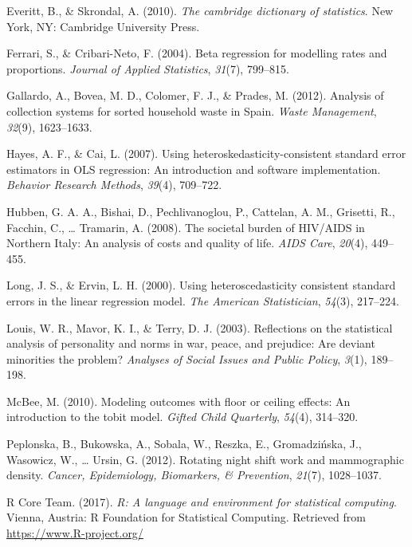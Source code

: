 \documentclass[english,man]{apa6}
\theoremstyle{definition}
\theoremstyle{definition}
\theoremstyle{remark}
\begin{document}
\hypertarget{ref-everitt2002cambridge}{}
Everitt, B., \& Skrondal, A. (2010). \emph{The cambridge dictionary of
statistics}. New York, NY: Cambridge University Press.

\hypertarget{ref-ferrari2004beta}{}
Ferrari, S., \& Cribari-Neto, F. (2004). Beta regression for modelling
rates and proportions. \emph{Journal of Applied Statistics},
\emph{31}(7), 799--815.

\hypertarget{ref-gallardo2012analysis}{}
Gallardo, A., Bovea, M. D., Colomer, F. J., \& Prades, M. (2012).
Analysis of collection systems for sorted household waste in Spain.
\emph{Waste Management}, \emph{32}(9), 1623--1633.

\hypertarget{ref-hayes2007using}{}
Hayes, A. F., \& Cai, L. (2007). Using heteroskedasticity-consistent
standard error estimators in OLS regression: An introduction and
software implementation. \emph{Behavior Research Methods}, \emph{39}(4),
709--722.

\hypertarget{ref-hubben2008societal}{}
Hubben, G. A. A., Bishai, D., Pechlivanoglou, P., Cattelan, A. M.,
Grisetti, R., Facchin, C., \ldots{} Tramarin, A. (2008). The societal
burden of HIV/AIDS in Northern Italy: An analysis of costs and quality
of life. \emph{AIDS Care}, \emph{20}(4), 449--455.

\hypertarget{ref-long2000using}{}
Long, J. S., \& Ervin, L. H. (2000). Using heteroscedasticity consistent
standard errors in the linear regression model. \emph{The American
Statistician}, \emph{54}(3), 217--224.

\hypertarget{ref-louis2003reflections}{}
Louis, W. R., Mavor, K. I., \& Terry, D. J. (2003). Reflections on the
statistical analysis of personality and norms in war, peace, and
prejudice: Are deviant minorities the problem? \emph{Analyses of Social
Issues and Public Policy}, \emph{3}(1), 189--198.

\hypertarget{ref-mcbee2010modeling}{}
McBee, M. (2010). Modeling outcomes with floor or ceiling effects: An
introduction to the tobit model. \emph{Gifted Child Quarterly},
\emph{54}(4), 314--320.

\hypertarget{ref-peplonska2012rotating}{}
Peplonska, B., Bukowska, A., Sobala, W., Reszka, E., Gromadzińska, J.,
Wasowicz, W., \ldots{} Ursin, G. (2012). Rotating night shift work and
mammographic density. \emph{Cancer, Epidemiology, Biomarkers, \&
Prevention}, \emph{21}(7), 1028--1037.

\hypertarget{ref-rcore2017}{}
R Core Team. (2017). \emph{R: A language and environment for statistical
computing}. Vienna, Austria: R Foundation for Statistical Computing.
Retrieved from \url{https://www.R-project.org/}
\end{document}
